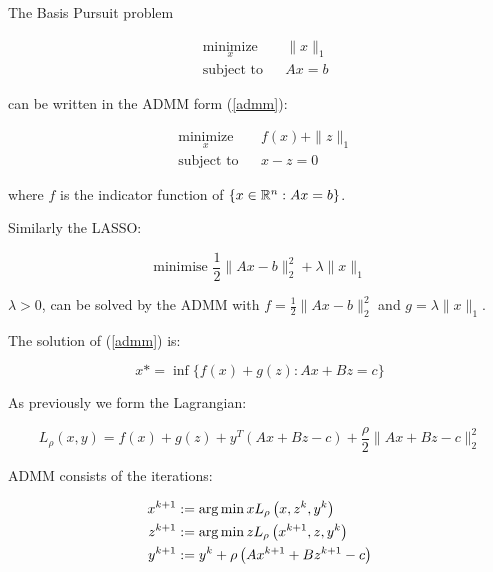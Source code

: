 \documentclass[titlepage]{article}
\begin{document}
\begin{example}
The Basis Pursuit problem

\begin{equation*}
\begin{aligned}
& \underset{x}{\text{minimize}}
& & \|x\|_1 \\
& \text{subject to}
& & Ax = b
\label{bp}
\end{aligned}
\end{equation*}

can be written in the ADMM form (\ref{admm}):

\begin{equation*}
\begin{aligned}
& \underset{x}{\text{minimize}}
& & f\left( x \right) + \|z\|_1 \\
& \text{subject to}
& & x - z = 0
\label{bp_reform}
\end{aligned}
\end{equation*}

where \(f\) is the indicator function of \(\{x\in {\mathbb{R}}^n : Ax = b\}\). 

\end{example} 

\begin{example}
Similarly the LASSO:

\begin{equation}
\text{minimise } \frac{1}{2}\|Ax-b\|_2^2 + \lambda\|x\|_1
\end{equation}

\(\lambda > 0\), can be solved by the ADMM with \(f = \frac{1}{2}\|Ax-b\|_2^2\) and \(g = \lambda\|x\|_1\).

\end{example}

The solution of (\ref{admm}) is:

\begin{equation}
x* = \inf\{f\left( x \right) + g\left(z\right) : Ax +Bz = c\}
\end{equation}

As previously we form the Lagrangian:

\begin{equation}
L_\rho\left(x,y\right) = f\left( x \right) + g\left(z\right) + y^T\left(Ax+Bz-c\right) + \frac{\rho}{2}\|Ax+Bz-c\|_2^2
\end{equation}

ADMM consists of the iterations:

\begin{align}
x^{k+1} &:= \operatorname*{arg\,min}{x} L_\rho\left(x,z^k,y^k\right)\\
z^{k+1} &:= \operatorname*{arg\,min}{z} L_\rho\left(x^{k+1},z,y^k\right)\\
y^{k+1} &:= y^{k} + \rho \left(Ax^{k+1} + Bz^{k+1} - c\right)
\label{admm_algo}
\end{align}
\end{document}
